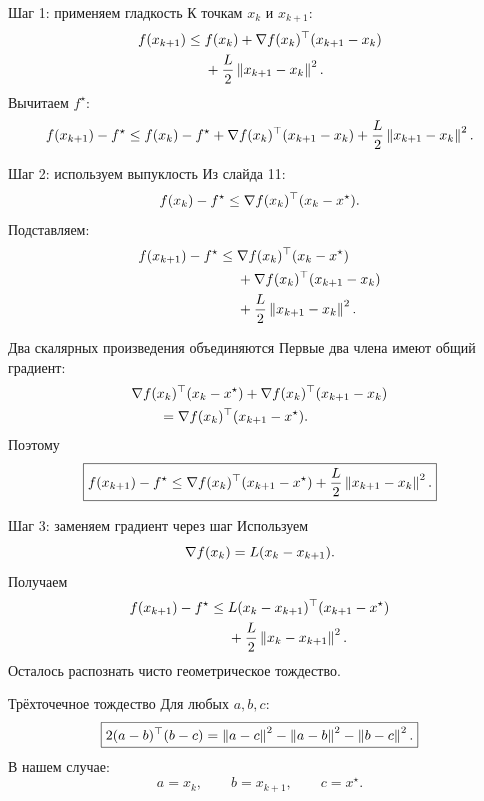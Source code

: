\begin{frame}{Шаг 1: применяем гладкость}
\small
К точкам $x_k$ и $x_{k+1}$:
\[
\begin{aligned}
f(x_{k+1})
\le{}&
f(x_k)
+\nabla f(x_k)^\top(x_{k+1}-x_k)\\
&+\frac L2\left\lVert x_{k+1}-x_k\right\rVert^2.
\end{aligned}
\]
Вычитаем $f^\star$:
\[
f(x_{k+1})-f^\star
\le
f(x_k)-f^\star
+\nabla f(x_k)^\top(x_{k+1}-x_k)
+\frac L2\left\lVert x_{k+1}-x_k\right\rVert^2.
\]
\end{frame}

\begin{frame}{Шаг 2: используем выпуклость}
\small
Из слайда 11:
\[
f(x_k)-f^\star
\le
\nabla f(x_k)^\top(x_k-x^\star).
\]
Подставляем:
\[
\begin{aligned}
f(x_{k+1})-f^\star
\le{}&
\nabla f(x_k)^\top(x_k-x^\star)\\
&+\nabla f(x_k)^\top(x_{k+1}-x_k)\\
&+\frac L2\left\lVert x_{k+1}-x_k\right\rVert^2.
\end{aligned}
\]
\end{frame}

\begin{frame}{Два скалярных произведения объединяются}
\small
Первые два члена имеют общий градиент:
\[
\begin{aligned}
&\nabla f(x_k)^\top(x_k-x^\star)
+\nabla f(x_k)^\top(x_{k+1}-x_k)\\
&\qquad=
\nabla f(x_k)^\top(x_{k+1}-x^\star).
\end{aligned}
\]
Поэтому
\[
\boxed{
f(x_{k+1})-f^\star
\le
\nabla f(x_k)^\top(x_{k+1}-x^\star)
+\frac L2\left\lVert x_{k+1}-x_k\right\rVert^2.
}
\]
\end{frame}

\begin{frame}{Шаг 3: заменяем градиент через шаг}
\small
Используем
\[
\nabla f(x_k)=L(x_k-x_{k+1}).
\]
Получаем
\[
\begin{aligned}
f(x_{k+1})-f^\star
\le{}&
L(x_k-x_{k+1})^\top(x_{k+1}-x^\star)\\
&+\frac L2\left\lVert x_k-x_{k+1}\right\rVert^2.
\end{aligned}
\]
Осталось распознать чисто геометрическое тождество.
\end{frame}

\begin{frame}{Трёхточечное тождество}
\small
Для любых $a,b,c$:
\[
\boxed{
2(a-b)^\top(b-c)
=
\left\lVert a-c\right\rVert^2
-\left\lVert a-b\right\rVert^2
-\left\lVert b-c\right\rVert^2.
}
\]
В нашем случае:
\[
a=x_k,
\qquad
b=x_{k+1},
\qquad
c=x^\star.
\]
\end{frame}

